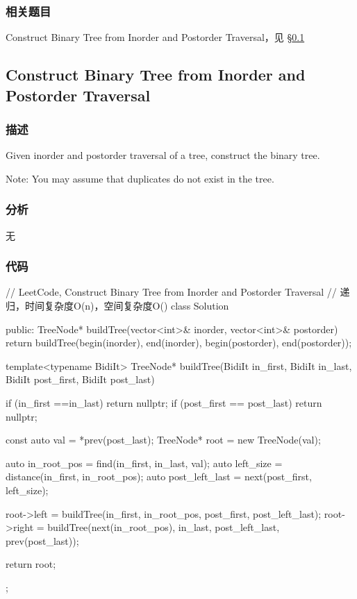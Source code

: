 \subsubsection{相关题目}
\begindot
\item Construct Binary Tree from Inorder and Postorder Traversal，见 \S \ref{sec:construct-binary-tree-from-inorder-and-postorder-traversal}
\myenddot


\subsection{Construct Binary Tree from Inorder and Postorder Traversal}
\label{sec:construct-binary-tree-from-inorder-and-postorder-traversal}


\subsubsection{描述}
Given inorder and postorder traversal of a tree, construct the binary tree.

Note:
You may assume that duplicates do not exist in the tree.


\subsubsection{分析}
无


\subsubsection{代码}
\begin{Code}
// LeetCode, Construct Binary Tree from Inorder and Postorder Traversal
// 递归，时间复杂度O(n)，空间复杂度O(\logn)
class Solution {
public:
    TreeNode* buildTree(vector<int>& inorder, vector<int>& postorder) {
        return buildTree(begin(inorder), end(inorder),
                begin(postorder), end(postorder));
    }

    template<typename BidiIt>
    TreeNode* buildTree(BidiIt in_first, BidiIt in_last,
            BidiIt post_first, BidiIt post_last) {
        if (in_first ==in_last) return nullptr;
        if (post_first == post_last) return nullptr;

        const auto val = *prev(post_last);
        TreeNode* root = new TreeNode(val);

        auto in_root_pos = find(in_first, in_last, val);
        auto left_size = distance(in_first, in_root_pos);
        auto post_left_last = next(post_first, left_size);

        root->left = buildTree(in_first, in_root_pos, post_first, post_left_last);
        root->right = buildTree(next(in_root_pos), in_last, post_left_last,
                prev(post_last));

        return root;
    }
};
\end{Code}


